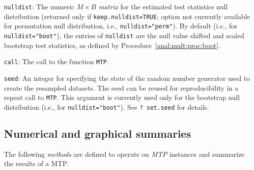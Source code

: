 \documentclass[11pt]{article}
\newcommand{\Robject}[1]{\texttt{#1}}
\newcommand{\Rclass}[1]{\textit{#1}}
\begin{document}
\begin{description}
\item{\Robject{nulldist}:} The numeric $M \times B$ \Rclass{matrix} for the estimated test statistics null distribution (returned only if \texttt{keep.nulldist=TRUE}; option not currently available for permutation null distribution, i.e.,  \texttt{nulldist="perm"}).
By default (i.e., for \Robject{nulldist="boot"}), the entries of \Robject{nulldist} are the null value shifted and scaled bootstrap test statistics, as defined by Procedure~\ref{anal:mult:proc:boot}.

\item{\Robject{call}:} The call to the function \Robject{MTP}.

\item{\Robject{seed}:} 
An integer for specifying the state of the random number generator used to create the resampled datasets. 
The seed can be reused for reproducibility in a repeat call to \Robject{MTP}. 
This argument is currently used only for the bootstrap null distribution (i.e., for \texttt{nulldist="boot"}).
See \texttt{? set.seed} for details.


\end{description}

\subsection{Numerical and graphical summaries}
\label{anal:mult:s:summaries}

The following {\em methods} are defined to operate on \Rclass{MTP} instances and summarize the results of a MTP.
\end{document}
